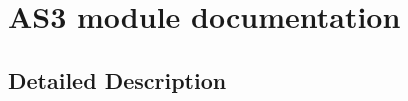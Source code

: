 \hypertarget{group___a_s3__module}{}\section{A\+S3 module documentation}
\label{group___a_s3__module}


\subsection{Detailed Description}
